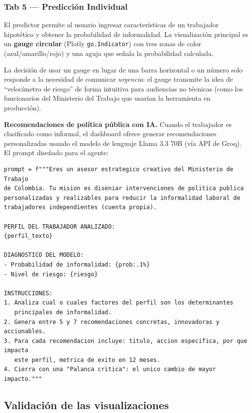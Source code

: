 \documentclass[12pt, a4paper]{article}
\begin{document}
\subsubsection{Tab 5 — Predicción Individual}

El predictor permite al usuario ingresar características de un trabajador hipotético
y obtener la probabilidad de informalidad. La visualización principal es un
\textbf{gauge circular} (Plotly \texttt{go.Indicator}) con tres zonas de color
(azul/amarillo/rojo) y una aguja que señala la probabilidad calculada.

La decisión de usar un gauge en lugar de una barra horizontal o un número solo responde
a la necesidad de comunicar \textit{urgencia}: el gauge transmite la idea de ``velocímetro
de riesgo'' de forma intuitiva para audiencias no técnicas (como los funcionarios
del Ministerio del Trabajo que usarían la herramienta en producción).

\textbf{Recomendaciones de política pública con IA.} Cuando el trabajador es
clasificado como informal, el dashboard ofrece generar recomendaciones personalizadas
usando el modelo de lenguaje Llama 3.3 70B (vía API de Groq). El prompt diseñado para
el agente:

\begin{lstlisting}[caption={Prompt del agente de recomendaciones de política pública}]
prompt = f"""Eres un asesor estrategico creativo del Ministerio de Trabajo
de Colombia. Tu mision es diseniar intervenciones de politica publica
personalizadas y realizables para reducir la informalidad laboral de
trabajadores independientes (cuenta propia).

PERFIL DEL TRABAJADOR ANALIZADO:
{perfil_texto}

DIAGNOSTICO DEL MODELO:
- Probabilidad de informalidad: {prob:.1%}
- Nivel de riesgo: {riesgo}

INSTRUCCIONES:
1. Analiza cual o cuales factores del perfil son los determinantes
   principales de informalidad.
2. Genera entre 5 y 7 recomendaciones concretas, innovadoras y accionables.
3. Para cada recomendacion incluye: titulo, accion especifica, por que impacta
   este perfil, metrica de exito en 12 meses.
4. Cierra con una "Palanca critica": el unico cambio de mayor impacto."""
\end{lstlisting}

\subsection{Validación de las visualizaciones}
\end{document}
